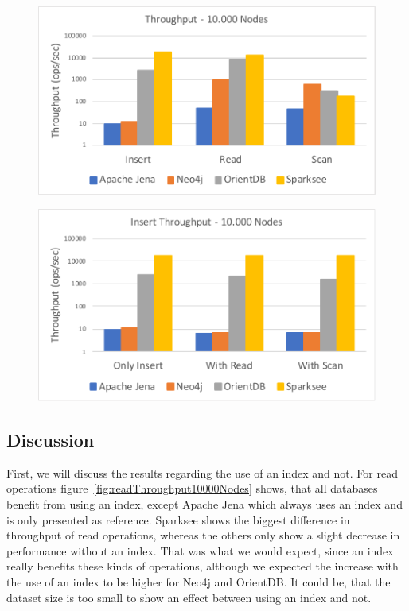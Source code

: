 \begin{figure}[h!]
  \centering
  \includegraphics[width=.75\textwidth]{images/responsiveness/operationReadScan}
  \label{fig:operationReadScan}
\end{figure}

\begin{figure}[h!]
  \centering
  \includegraphics[width=.75\textwidth]{images/responsiveness/insertWithWithoutReadScan}
  \label{fig:insertWithWithoutReadScan}
\end{figure}

\subsection{Discussion}
First,
we will discuss the results regarding the use of an index and not.
For read operations figure~\ref{fig:readThroughput10000Nodes} shows,
that all databases benefit from using an index,
except Apache Jena which always uses an index and is only presented as reference.
Sparksee shows the biggest difference in throughput of read operations,
whereas the others only show a slight decrease in performance without an index.
That was what we would expect,
since an index really benefits these kinds of operations,
although we expected the increase with the use of an index to be higher for Neo4j and OrientDB.
It could be,
that the dataset size is too small to show an effect between using an index and not.

